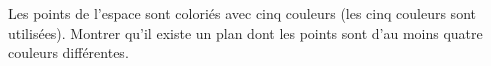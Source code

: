Les points de l'espace sont coloriés avec cinq couleurs (les cinq couleurs sont utilisées). Montrer qu'il existe un plan dont les points sont d'au moins quatre couleurs différentes.
